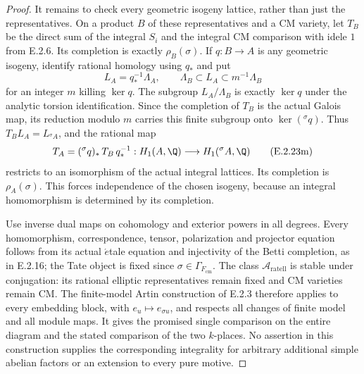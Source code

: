 \begin{proof}
It remains to check every geometric isogeny lattice, rather
than just the representatives. On a product \(B\) of these
representatives and a CM variety, let \(T_B\) be the direct
sum of the integral \(S_i\) and the integral CM comparison
with idele \(1\) from E.2.6. Its completion is exactly
\(\rho_B(\sigma)\). If \(q:B\to A\) is any geometric
isogeny, identify rational homology using \(q_*\) and put
\[
 L_A=q_*^{-1}\Lambda_A,
 \qquad \Lambda_B\subset L_A\subset m^{-1}\Lambda_B
 \tag{E.2.23l}
\]
for an integer \(m\) killing \(\ker q\).
The subgroup \(L_A/\Lambda_B\) is exactly \(\ker q\)
under the analytic torsion identification. Since the
completion of \(T_B\) is the actual Galois map, its
reduction modulo \(m\) carries this finite subgroup onto
\(\ker({}^{\sigma}q)\). Thus
\(T_B L_A=L_{{}^{\sigma}A}\), and the rational map
\[
 T_A=({}^{\sigma}q)_*\,T_B\,q_*^{-1}
       :H_1(A,\Q)\longrightarrow H_1({}^{\sigma}A,\Q)
 \tag{E.2.23m}
\]
restricts to an isomorphism of the actual integral lattices.
Its completion is \(\rho_A(\sigma)\). This forces
independence of the chosen isogeny, because an integral
homomorphism is determined by its completion.

Use inverse dual maps on cohomology and exterior powers in
all degrees. Every homomorphism, correspondence, tensor,
polarization and projector equation follows from its actual
\(\acute{e}\)tale equation and injectivity of the Betti
completion, as in E.2.16; the Tate object is fixed since
\(\sigma\in\Gamma_{F_{\mathrm{cm}}}\).
The class \(\mathcal A_{\mathrm{ratell}}\) is stable
under conjugation: its rational elliptic representatives
remain fixed and CM varieties remain CM. The finite-model
Artin construction of E.2.3 therefore applies to every
embedding block, with \(e_u\mapsto e_{\sigma u}\), and
respects all changes of finite model and all module maps.
It gives the promised single comparison on the entire
diagram and the stated comparison of the two \(k\)-places.
No assertion in this construction supplies the corresponding
integrality for arbitrary additional simple abelian factors
or an extension to every pure motive.
\end{proof}

